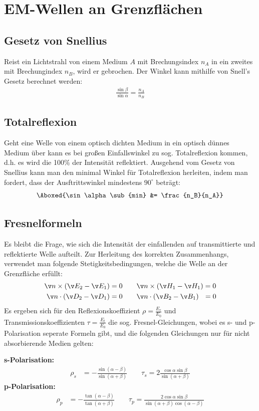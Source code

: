 \documentclass[twocolumn, unnumberedsubsub]{summery_5.0} %
\begin{document}
\section{EM-Wellen an Grenzflächen}
\subsection{Gesetz von Snellius}
Reist ein Lichtstrahl von einem Medium $A$ mit Brechungsindex \(n_A\) in ein zweites mit Brechungindex \(n_B\), wird er gebrochen. Der Winkel kann mithilfe von Snell's Gesetz berechnet werden:
\begin{align*}
    \boxed{\frac{\sin\beta}{\sin\alpha} = \frac{n_A}{n_B}}
\end{align*}

\subsection{Totalreflexion}
Geht eine Welle von einem optisch dichten Medium in ein optisch dünnes Medium über kann es bei großen Einfallswinkel zu sog. Totalreflexion kommen, d.h. es wird die 100$\%$ der Intensität reflektiert. Ausgehend vom Gesetz von Snellius kann man den minimal Winkel für Totalreflexion herleiten, indem man fordert, dass der Ausftrittswinkel mindestens $90^\circ$ beträgt:
\begin{align*}
    \Aboxed{\sin \alpha\sub{min} &= \frac {n_B}{n_A}}
\end{align*}

\subsection{Fresnelformeln}
Es bleibt die Frage, wie sich die Intensität der einfallenden auf transmittierte und reflektierte Welle aufteilt.
Zur Herleitung des korrekten Zusammenhangs, verwendet man folgende Stetigkeitsbedingungen, welche die Welle an der Grenzfläche erfüllt:
\begin{align*}
    \v n \times (\v E_2 - \v E_1) &= 0 \qquad \v n\times(\v H_1 - \v H_1)=0\\
    \v n \cdot (\v D_2 - \v D_1) &=0\qquad \v n \cdot (\v B_2 - \v B_1)\ \ =0
\end{align*} 
Es ergeben sich für den Reflexionskoeffizient $\rho=\frac{E_r}{E_0}$ und Transmissionskoeffizienten $\tau = \frac{E_t}{E_0}$ die sog. Fresnel-Gleichungen, wobei es s- und p-Polarisation seperate Formeln gibt, und die folgenden Gleichungen nur für nicht absorbierende Medien gelten: 
\begin{boxA}
{\bf s-Polarisation:}
\begin{align*}
    \rho_s &= - \frac{\sin(\alpha-\beta)}{\sin(\alpha+\beta)}
    \qquad \tau_s = 2\frac{\cos\alpha\sin\beta}{\sin(\alpha+\beta)}
\end{align*}
{\bf p-Polarisation:}
\begin{align*}
    \rho_p &= - \frac{\tan(\alpha-\beta)}{\tan(\alpha+\beta)}
    \qquad \tau_p = \frac{2\cos\alpha\sin\beta}{\sin(\alpha+\beta)\cos(\alpha-\beta)}
\end{align*}
\end{boxA}
\end{document}
